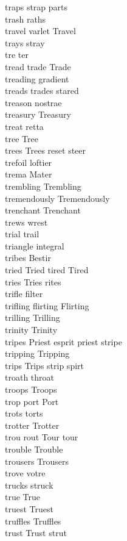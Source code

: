 traps strap parts\\
trash raths\\
travel varlet Travel\\
trays stray\\
tre ter\\
tread trade Trade\\
treading gradient\\
treads trades stared\\
treason nostrae\\
treasury Treasury\\
treat retta\\
tree Tree\\
trees Trees reset steer\\
trefoil loftier\\
trema Mater\\
trembling Trembling\\
tremendously Tremendously\\
trenchant Trenchant\\
trews wrest\\
trial trail\\
triangle integral\\
tribes Bestir\\
tried Tried tired Tired\\
tries Tries rites\\
trifle filter\\
trifling flirting Flirting\\
trilling Trilling\\
trinity Trinity\\
tripes Priest esprit priest stripe\\
tripping Tripping\\
trips Trips strip spirt\\
troath throat\\
troops Troops\\
trop port Port\\
trots torts\\
trotter Trotter\\
trou rout Tour tour\\
trouble Trouble\\
trousers Trousers\\
trove votre\\
trucks struck\\
true True\\
truest Truest\\
truffles Truffles\\
trust Trust strut\\
